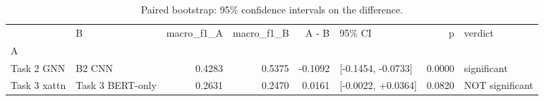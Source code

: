 \begin{table}[t]
\caption{Paired bootstrap: 95\% confidence intervals on the difference.}
\label{tab:boot}
\begin{tabular}{llrrrlrl}
\toprule
 & B & macro\_f1\_A & macro\_f1\_B & A - B & 95\% CI & p & verdict \\
A &  &  &  &  &  &  &  \\
\midrule
Task 2 GNN & B2 CNN & 0.4283 & 0.5375 & -0.1092 & [-0.1454, -0.0733] & 0.0000 & significant \\
Task 3 xattn & Task 3 BERT-only & 0.2631 & 0.2470 & 0.0161 & [-0.0022, +0.0364] & 0.0820 & NOT significant \\
\bottomrule
\end{tabular}
\end{table}
